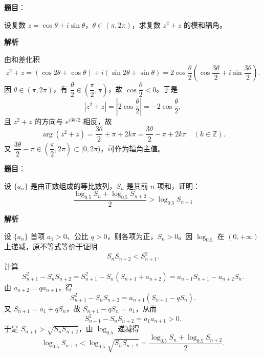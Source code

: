 \begin{answer}

\textbf{题目}：

设复数 $z=\cos\theta+i\sin\theta$，$\theta\in(\pi,2\pi)$，求复数 $z^2+z$ 的模和辐角。

\textbf{解析}

由和差化积
\nopagebreak[4]
\[z^2+z=(\cos2\theta+\cos\theta)+i(\sin2\theta+\sin\theta)=2\cos\frac\theta2\left(\cos\frac{3\theta}{2}+i\sin\frac{3\theta}{2}\right).\]
因 $\theta\in(\pi,2\pi)$，有 $\dfrac\theta2\in\left(\dfrac\pi2,\pi\right)$，故 $\cos\dfrac\theta2<0$。于是
\nopagebreak[4]
\[|z^2+z|=\left|2\cos\frac\theta2\right|=-2\cos\frac\theta2,\]
且 $z^2+z$ 的方向与 $e^{i3\theta/2}$ 相反，故
\nopagebreak[4]
\[\arg(z^2+z)=\frac{3\theta}{2}+\pi+2k\pi=\frac{3\theta}{2}-\pi+2k\pi\quad(k\in\mathbb Z).\]
又 $\dfrac{3\theta}{2}-\pi\in\left(\dfrac\pi2,2\pi\right)\subset[0,2\pi)$，可作为辐角主值。


\end{answer}
\begin{answer}

\textbf{题目}：

设 $\{a_n\}$ 是由正数组成的等比数列，$S_n$ 是其前 $n$ 项和，证明：
\nopagebreak[4]
\[
\frac{\log_{0.5}S_n+\log_{0.5}S_{n+2}}{2}>\log_{0.5}S_{n+1}
\]

\textbf{解析}

设 $\{a_n\}$ 首项 $a_1>0$、公比 $q>0$，则各项为正，$S_n>0$。因 $\log_{0.5}$ 在 $(0,+\infty)$ 上递减，原不等式等价于证明
\nopagebreak[4]
\[S_nS_{n+2}<S_{n+1}^2.\]
计算
\nopagebreak[4]
\[S_{n+1}^2-S_nS_{n+2}=S_{n+1}^2-S_n(S_{n+1}+a_{n+2})=a_{n+1}S_{n+1}-a_{n+2}S_n.\]
由 $a_{n+2}=qa_{n+1}$，得
\nopagebreak[4]
\[S_{n+1}^2-S_nS_{n+2}=a_{n+1}(S_{n+1}-qS_n).\]
又 $S_{n+1}=a_1+qS_n$，故 $S_{n+1}-qS_n=a_1$，从而
\nopagebreak[4]
\[S_{n+1}^2-S_nS_{n+2}=a_1a_{n+1}>0.\]
于是 $S_{n+1}>\sqrt{S_nS_{n+2}}$，由 $\log_{0.5}$ 递减得
\nopagebreak[4]
\[\log_{0.5}S_{n+1}<\log_{0.5}\sqrt{S_nS_{n+2}}=\frac{\log_{0.5}S_n+\log_{0.5}S_{n+2}}{2}.\]


\end{answer}
